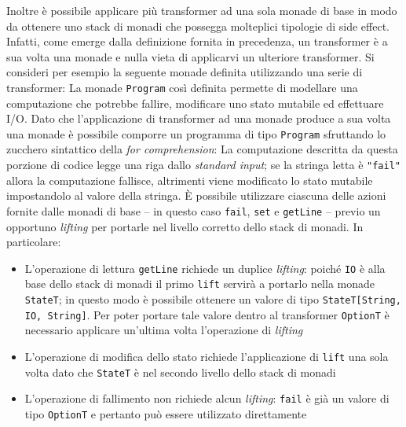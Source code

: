 Inoltre è possibile applicare più transformer ad una sola monade di base in modo da ottenere uno stack di monadi che possegga molteplici tipologie di side effect. Infatti, come emerge dalla definizione fornita in precedenza, un transformer è a sua volta una monade e nulla vieta di applicarvi un ulteriore transformer.
Si consideri per esempio la seguente monade definita utilizzando una serie di transformer:
La monade \lstinline{Program} così definita permette di modellare una computazione che potrebbe fallire, modificare uno stato mutabile ed effettuare I/O. Dato che l'applicazione di transformer ad una monade produce a sua volta una monade è possibile comporre un programma di tipo \lstinline{Program} sfruttando lo zucchero sintattico della \emph{for comprehension}:
La computazione descritta da questa porzione di codice legge una riga dallo \emph{standard input}; se la stringa letta è \lstinline{"fail"} allora la computazione fallisce, altrimenti viene modificato lo stato mutabile impostandolo al valore della stringa.
È possibile utilizzare ciascuna delle azioni fornite dalle monadi di base -- in questo caso \lstinline{fail}, \lstinline{set} e \lstinline{getLine} -- previo un opportuno \emph{lifting} per portarle nel livello corretto dello stack di monadi. In particolare:
\begin{itemize}
  \item L'operazione di lettura \lstinline{getLine} richiede un duplice \emph{lifting}: poiché \lstinline{IO} è alla base dello stack di monadi il primo \lstinline{lift} servirà a portarlo nella monade \lstinline{StateT}; in questo modo è possibile ottenere un valore di tipo \lstinline{StateT[String, IO, String]}. Per poter portare tale valore dentro al transformer \lstinline{OptionT} è necessario applicare un'ultima volta l'operazione di \emph{lifting}
  \item L'operazione di modifica dello stato richiede l'applicazione di \lstinline{lift} una sola volta dato che \lstinline{StateT} è nel secondo livello dello stack di monadi
  \item L'operazione di fallimento non richiede alcun \emph{lifting}: \lstinline{fail} è già un valore di tipo \lstinline{OptionT} e pertanto può essere utilizzato direttamente
\end{itemize}

